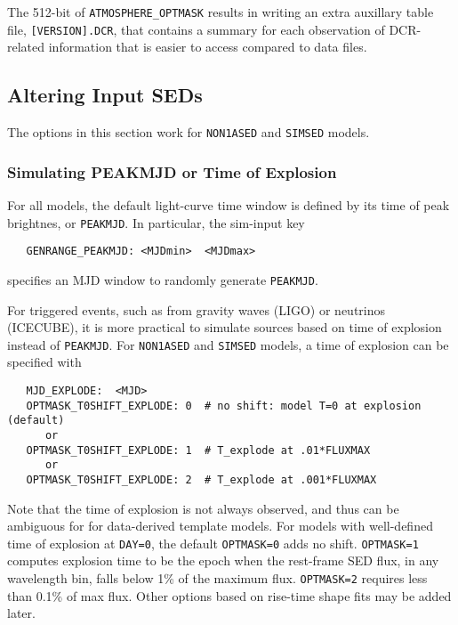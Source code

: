 \documentclass[12pt]{article}
\begin{document}
The 512-bit of {\tt ATMOSPHERE\_OPTMASK} results in writing
an extra auxillary table file, {\tt [VERSION].DCR}, that contains a
summary for each observation of DCR-related information that is easier 
to access compared to data files.

\clearpage
\subsection{Altering Input SEDs}
\label{subsec:Alter_SED}

The options in this section work for 
{\tt NON1ASED} and {\tt SIMSED} models.

\subsubsection{Simulating PEAKMJD or Time of Explosion}
\label{sss:tpeak_or_texplode}


For all models, the default light-curve time window is
defined by its time of peak brightnes, or {\tt PEAKMJD}.
In particular, the sim-input key 
\begin{verbatim}
   GENRANGE_PEAKMJD: <MJDmin>  <MJDmax>
\end{verbatim}
specifies an MJD window to randomly generate {\tt PEAKMJD}.

For triggered events, 
such as from gravity waves (LIGO) or neutrinos (ICECUBE),
it is more practical to simulate sources based on time
of explosion instead of {\tt PEAKMJD}. 
For {\tt NON1ASED} and {\tt SIMSED} models,
a time of explosion can be specified with
\begin{verbatim}
   MJD_EXPLODE:  <MJD>
   OPTMASK_T0SHIFT_EXPLODE: 0  # no shift: model T=0 at explosion (default)
      or
   OPTMASK_T0SHIFT_EXPLODE: 1  # T_explode at .01*FLUXMAX 
      or
   OPTMASK_T0SHIFT_EXPLODE: 2  # T_explode at .001*FLUXMAX
\end{verbatim}
%
Note that the time of explosion is not always observed, 
and thus can be ambiguous for for data-derived template models. 
For models with well-defined time of explosion at {\tt DAY=0},
the default {\tt OPTMASK=0} adds no shift.
{\tt OPTMASK=1} computes explosion time to be the epoch when 
the rest-frame SED flux, in any wavelength bin,  
falls below 1\% of the maximum flux.
{\tt OPTMASK=2} requires less than 0.1\% of max flux.
Other options based on rise-time shape fits may be added later.
\end{document}
